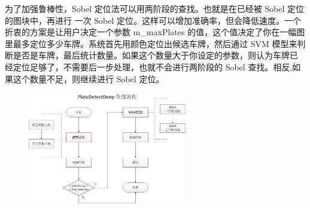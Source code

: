 为了加强鲁棒性，Sobel 定位法可以用两阶段的查找。也就是在已经被 Sobel 定位的图块中，再进行 一次 Sobel 定位。这样可以增加准确率，但会降低速度。一个折衷的方案是让用户决定一个参数 m\_maxPlates 的值，这个值决定了你在一幅图里最多定位多少车牌。系统首先用颜色定位出候选车牌，然后通过 SVM 模型来判断是否是车牌，最后统计数量。如果这个数量大于你设定的参数，则认为车牌已 经定位足够了，不需要后一步处理，也就不会进行两阶段的 Sobel 查找。相反,如果这个数量不足，则继续进行 Sobel 定位。 
\begin{figure}[H]
    \centering 
    \includegraphics[width=0.618\textwidth]{image/2_6_3_1.jpg}    
    \label{logic}
\end{figure}
